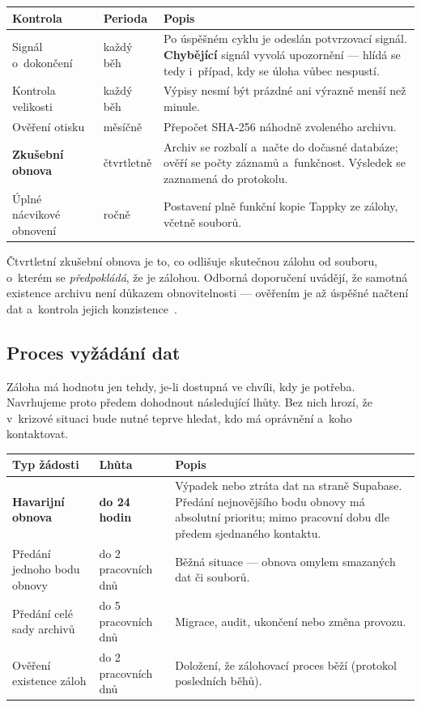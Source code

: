 \documentclass[11pt,a4paper]{article}
\begin{document}
\begin{center}
\begin{tabularx}{\textwidth}{@{}p{3.6cm}p{2.6cm}X@{}}
\toprule
\textbf{Kontrola} & \textbf{Perioda} & \textbf{Popis} \\
\midrule
Signál o~dokončení & každý běh & Po úspěšném cyklu je odeslán potvrzovací signál. \textbf{Chybějící} signál vyvolá upozornění --- hlídá se tedy i~případ, kdy se úloha vůbec nespustí. \\
Kontrola velikosti & každý běh & Výpisy nesmí být prázdné ani výrazně menší než minule. \\
Ověření otisku & měsíčně & Přepočet SHA-256 náhodně zvoleného archivu. \\
\textbf{Zkušební obnova} & čtvrtletně & Archiv se rozbalí a~načte do dočasné databáze; ověří se počty záznamů a~funkčnost. Výsledek se zaznamená do protokolu. \\
Úplné nácvikové obnovení & ročně & Postavení plně funkční kopie Tappky ze zálohy, včetně souborů. \\
\bottomrule
\end{tabularx}
\end{center}

\medskip
Čtvrtletní zkušební obnova je to, co odlišuje skutečnou zálohu od souboru, o~kterém se
\emph{předpokládá}, že je zálohou. Odborná doporučení uvádějí, že samotná existence archivu není
důkazem obnovitelnosti --- ověřením je až úspěšné načtení dat a~kontrola jejich
konzistence~\cite{pravidlo321}.

\subsection{Proces vyžádání dat}
\label{sec:vyzadani}

Záloha má hodnotu jen tehdy, je-li dostupná ve chvíli, kdy je potřeba. Navrhujeme proto předem
dohodnout následující lhůty. Bez nich hrozí, že v~krizové situaci bude nutné teprve hledat, kdo
má oprávnění a~koho kontaktovat.

\begin{center}
\begin{tabularx}{\textwidth}{@{}p{4.2cm}p{3.4cm}X@{}}
\toprule
\textbf{Typ žádosti} & \textbf{Lhůta} & \textbf{Popis} \\
\midrule
\textbf{Havarijní obnova} & \textbf{do 24 hodin} & Výpadek nebo ztráta dat na straně Supabase. Předání nejnovějšího bodu obnovy má absolutní prioritu; mimo pracovní dobu dle předem sjednaného kontaktu. \\
Předání jednoho bodu obnovy & do 2 pracovních dnů & Běžná situace --- obnova omylem smazaných dat či souborů. \\
Předání celé sady archivů & do 5 pracovních dnů & Migrace, audit, ukončení nebo změna provozu. \\
Ověření existence záloh & do 2 pracovních dnů & Doložení, že zálohovací proces běží (protokol posledních běhů). \\
\bottomrule
\end{tabularx}
\end{center}
\end{document}
